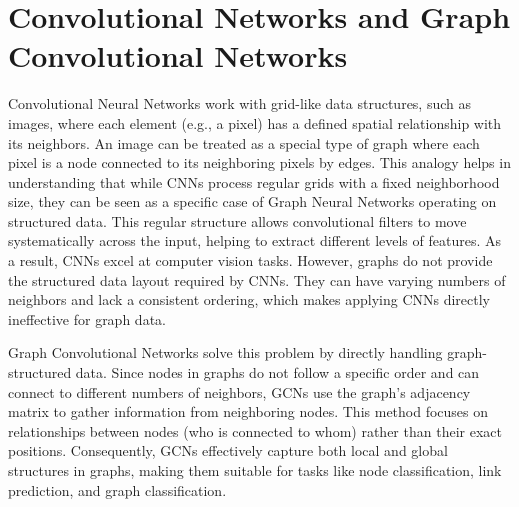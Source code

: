\section{Convolutional Networks and Graph Convolutional Networks}
Convolutional Neural Networks work with grid-like data structures, such as images, where each element (e.g., a pixel) has a defined spatial relationship with its neighbors. An image can be treated as a special type of graph where each pixel is a node connected to its neighboring pixels by edges. This analogy helps in understanding that while CNNs process regular grids with a fixed neighborhood size, they can be seen as a specific case of Graph Neural Networks operating on structured data. This regular structure allows convolutional filters to move systematically across the input, helping to extract different levels of features. As a result, CNNs excel at computer vision tasks. However, graphs do not provide the structured data layout required by CNNs. They can have varying numbers of neighbors and lack a consistent ordering, which makes applying CNNs directly ineffective for graph data.

Graph Convolutional Networks solve this problem by directly handling graph-structured data. Since nodes in graphs do not follow a specific order and can connect to different numbers of neighbors, GCNs use the graph's adjacency matrix to gather information from neighboring nodes. This method focuses on relationships between nodes (who is connected to whom) rather than their exact positions. Consequently, GCNs effectively capture both local and global structures in graphs, making them suitable for tasks like node classification, link prediction, and graph classification.


